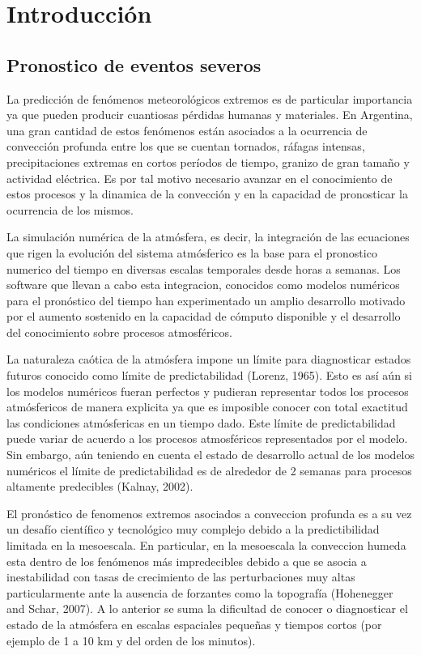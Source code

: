\documentclass[12pt,oneside,a4paper]{reedthesis}
\begin{document}
\hypertarget{introducciuxf3n}{%
\chapter{Introducción}\label{introducciuxf3n}}

\hypertarget{pronostico-de-eventos-severos}{%
\section{Pronostico de eventos severos}\label{pronostico-de-eventos-severos}}

La predicción de fenómenos meteorológicos extremos es de particular importancia ya que pueden producir cuantiosas pérdidas humanas y materiales. En Argentina, una gran cantidad de estos fenómenos están asociados a la ocurrencia de convección profunda entre los que se cuentan tornados, ráfagas intensas, precipitaciones extremas en cortos períodos de tiempo, granizo de gran tamaño y actividad eléctrica. Es por tal motivo necesario avanzar en el conocimiento de estos procesos y la dinamica de la convección y en la capacidad de pronosticar la ocurrencia de los mismos.

La simulación numérica de la atmósfera, es decir, la integración de las ecuaciones que rigen la evolución del sistema atmósferico es la base para el pronostico numerico del tiempo en diversas escalas temporales desde horas a semanas. Los software que llevan a cabo esta integracion, conocidos como modelos numéricos para el pronóstico del tiempo han experimentado un amplio desarrollo motivado por el aumento sostenido en la capacidad de cómputo disponible y el desarrollo del conocimiento sobre procesos atmosféricos.

La naturaleza caótica de la atmósfera impone un límite para diagnosticar estados futuros conocido como límite de predictabilidad (Lorenz, 1965). Esto es así aún si los modelos numéricos fueran perfectos y pudieran representar todos los procesos atmósfericos de manera explicita ya que es imposible conocer con total exactitud las condiciones atmósfericas en un tiempo dado. Este límite de predictabilidad puede variar de acuerdo a los procesos atmosféricos representados por el modelo. Sin embargo, aún teniendo en cuenta el estado de desarrollo actual de los modelos numéricos el límite de predictabilidad es de alrededor de 2 semanas para procesos altamente predecibles (Kalnay, 2002).

El pronóstico de fenomenos extremos asociados a conveccion profunda es a su vez un desafío científico y tecnológico muy complejo debido a la predictibilidad limitada en la mesoescala. En particular, en la mesoescala la conveccion humeda esta dentro de los fenómenos más impredecibles debido a que se asocia a inestabilidad con tasas de crecimiento de las perturbaciones muy altas particularmente ante la ausencia de forzantes como la topografía (Hohenegger and Schar, 2007). A lo anterior se suma la dificultad de conocer o diagnosticar el estado de la atmósfera en escalas espaciales pequeñas y tiempos cortos (por ejemplo de 1 a 10 km y del orden de los minutos).
\end{document}
